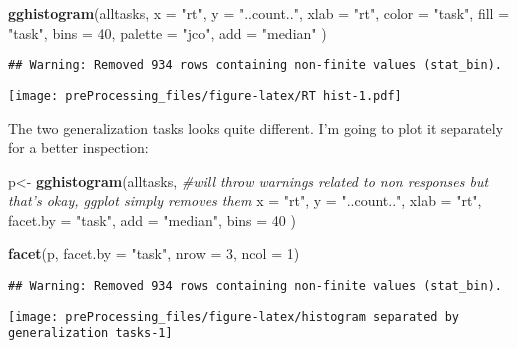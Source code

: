 \documentclass[
]{article}
\newenvironment{Shaded}{\begin{snugshade}}{\end{snugshade}}
\newcommand{\CommentTok}[1]{\textcolor[rgb]{0.56,0.35,0.01}{\textit{#1}}}
\newcommand{\DataTypeTok}[1]{\textcolor[rgb]{0.13,0.29,0.53}{#1}}
\newcommand{\DecValTok}[1]{\textcolor[rgb]{0.00,0.00,0.81}{#1}}
\newcommand{\KeywordTok}[1]{\textcolor[rgb]{0.13,0.29,0.53}{\textbf{#1}}}
\newcommand{\NormalTok}[1]{#1}
\newcommand{\StringTok}[1]{\textcolor[rgb]{0.31,0.60,0.02}{#1}}
\begin{document}
\begin{Shaded}
\begin{Highlighting}[]
\KeywordTok{gghistogram}\NormalTok{(alltasks,}
       \DataTypeTok{x =} \StringTok{"rt"}\NormalTok{,}
       \DataTypeTok{y =} \StringTok{"..count.."}\NormalTok{,}
       \DataTypeTok{xlab =} \StringTok{"rt"}\NormalTok{, }
       \DataTypeTok{color =} \StringTok{"task"}\NormalTok{, }
       \DataTypeTok{fill =} \StringTok{"task"}\NormalTok{,}
       \DataTypeTok{bins =} \DecValTok{40}\NormalTok{,}
       \DataTypeTok{palette =} \StringTok{"jco"}\NormalTok{,}
       \DataTypeTok{add =} \StringTok{"median"}
\NormalTok{)}
\end{Highlighting}
\end{Shaded}

\begin{verbatim}
## Warning: Removed 934 rows containing non-finite values (stat_bin).
\end{verbatim}

\texttt{[image: preProcessing\_files/figure-latex/RT hist-1.pdf]}

The two generalization tasks looks quite different. I'm going to plot it
separately for a better inspection:

\begin{Shaded}
\begin{Highlighting}[]
\NormalTok{p<-}\StringTok{ }\KeywordTok{gghistogram}\NormalTok{(alltasks, }\CommentTok{#will throw warnings related to non responses but that's okay, ggplot simply removes them}
       \DataTypeTok{x =} \StringTok{"rt"}\NormalTok{,}
       \DataTypeTok{y =} \StringTok{"..count.."}\NormalTok{,}
       \DataTypeTok{xlab =} \StringTok{"rt"}\NormalTok{,}
       \DataTypeTok{facet.by =} \StringTok{"task"}\NormalTok{,}
       \DataTypeTok{add =} \StringTok{"median"}\NormalTok{,}
       \DataTypeTok{bins =} \DecValTok{40}
\NormalTok{)}

\KeywordTok{facet}\NormalTok{(p, }\DataTypeTok{facet.by =} \StringTok{"task"}\NormalTok{,}
      \DataTypeTok{nrow =} \DecValTok{3}\NormalTok{,}
      \DataTypeTok{ncol =} \DecValTok{1}\NormalTok{)}
\end{Highlighting}
\end{Shaded}

\begin{verbatim}
## Warning: Removed 934 rows containing non-finite values (stat_bin).
\end{verbatim}

\begin{center}\texttt{[image: preProcessing\_files/figure-latex/histogram separated by generalization tasks-1]} \end{center}
\end{document}
